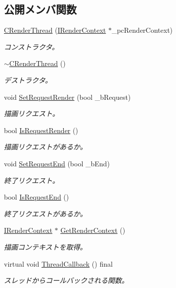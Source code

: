 \subsection*{公開メンバ関数}
\begin{DoxyCompactItemize}
\item 
\hyperlink{class_c_render_thread_a2a679469847619c4525b60e9577aa70e}{C\+Render\+Thread} (\hyperlink{class_i_render_context}{I\+Render\+Context} $\ast$\+\_\+pc\+Render\+Context)
\begin{DoxyCompactList}\small\item\em コンストラクタ。 \end{DoxyCompactList}\item 
\hyperlink{class_c_render_thread_a7316ff44713f7951734875ef97fc0e64}{$\sim$\+C\+Render\+Thread} ()
\begin{DoxyCompactList}\small\item\em デストラクタ。 \end{DoxyCompactList}\item 
void \hyperlink{class_c_render_thread_a401df3e527ca4873e93d918ef10f0728}{Set\+Request\+Render} (bool \+\_\+b\+Request)
\begin{DoxyCompactList}\small\item\em 描画リクエスト。 \end{DoxyCompactList}\item 
bool \hyperlink{class_c_render_thread_a31a0dcd1c30f9366a53ea488444084d8}{Is\+Request\+Render} ()
\begin{DoxyCompactList}\small\item\em 描画リクエストがあるか。 \end{DoxyCompactList}\item 
void \hyperlink{class_c_render_thread_a17632fe814d63824d67c1ac96189dd6a}{Set\+Request\+End} (bool \+\_\+b\+End)
\begin{DoxyCompactList}\small\item\em 終了リクエスト。 \end{DoxyCompactList}\item 
bool \hyperlink{class_c_render_thread_abe60a79fc237ed4b620a11d3b35bdd66}{Is\+Request\+End} ()
\begin{DoxyCompactList}\small\item\em 終了リクエストがあるか。 \end{DoxyCompactList}\item 
\hyperlink{class_i_render_context}{I\+Render\+Context} $\ast$ \hyperlink{class_c_render_thread_aee6242ad8ffff36301faf978cb4065b7}{Get\+Render\+Context} ()
\begin{DoxyCompactList}\small\item\em 描画コンテキストを取得。 \end{DoxyCompactList}\item 
virtual void \hyperlink{class_c_render_thread_ac6c5c64b626dd62ad0d04e2a69db73ee}{Thread\+Callback} () final
\begin{DoxyCompactList}\small\item\em スレッドからコールバックされる関数。 \end{DoxyCompactList}\end{DoxyCompactItemize}
